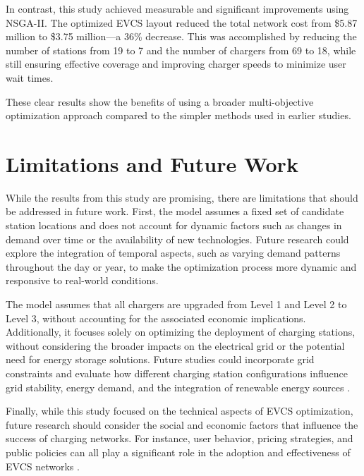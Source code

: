In contrast, this study achieved measurable and significant improvements using NSGA-II. The optimized EVCS layout reduced the total network cost from \$5.87 million to \$3.75 million—a 36\% decrease. This was accomplished by reducing the number of stations from 19 to 7 and the number of chargers from 69 to 18, while still ensuring effective coverage and improving charger speeds to minimize user wait times.

These clear results show the benefits of using a broader multi-objective optimization approach compared to the simpler methods used in earlier studies.

\section{Limitations and Future Work}

While the results from this study are promising, there are limitations that should be addressed in future work. First, the model assumes a fixed set of candidate station locations and does not account for dynamic factors such as changes in demand over time or the availability of new technologies. Future research could explore the integration of temporal aspects, such as varying demand patterns throughout the day or year, to make the optimization process more dynamic and responsive to real-world conditions.

The model assumes that all chargers are upgraded from Level 1 and Level 2 to Level 3, without accounting for the associated economic implications. Additionally, it focuses solely on optimizing the deployment of charging stations, without considering the broader impacts on the electrical grid or the potential need for energy storage solutions. Future studies could incorporate grid constraints and evaluate how different charging station configurations influence grid stability, energy demand, and the integration of renewable energy sources \cite{A review of charging technologies and infrastructure for electric vehicles. Transportation Research}.


Finally, while this study focused on the technical aspects of EVCS optimization, future research should consider the social and economic factors that influence the success of charging networks. For instance, user behavior, pricing strategies, and public policies can all play a significant role in the adoption and effectiveness of EVCS networks \citep{A genetic algorithm-based optimization for the location of electric vehicle charging stations}.
